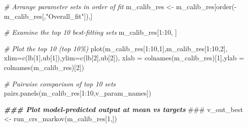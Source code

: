 \documentclass[
]{article}
\newenvironment{Shaded}{\begin{snugshade}}{\end{snugshade}}
\newcommand{\AlertTok}[1]{\textcolor[rgb]{0.94,0.16,0.16}{#1}}
\newcommand{\AttributeTok}[1]{\textcolor[rgb]{0.77,0.63,0.00}{#1}}
\newcommand{\CommentTok}[1]{\textcolor[rgb]{0.56,0.35,0.01}{\textit{#1}}}
\newcommand{\DecValTok}[1]{\textcolor[rgb]{0.00,0.00,0.81}{#1}}
\newcommand{\DocumentationTok}[1]{\textcolor[rgb]{0.56,0.35,0.01}{\textbf{\textit{#1}}}}
\newcommand{\FunctionTok}[1]{\textcolor[rgb]{0.00,0.00,0.00}{#1}}
\newcommand{\NormalTok}[1]{#1}
\newcommand{\OtherTok}[1]{\textcolor[rgb]{0.56,0.35,0.01}{#1}}
\newcommand{\SpecialCharTok}[1]{\textcolor[rgb]{0.00,0.00,0.00}{#1}}
\newcommand{\StringTok}[1]{\textcolor[rgb]{0.31,0.60,0.02}{#1}}
\begin{document}
\begin{Shaded}
\begin{Highlighting}[]
\CommentTok{\# Arrange parameter sets in order of fit}
\NormalTok{m\_calib\_res }\OtherTok{\textless{}{-}}\NormalTok{ m\_calib\_res[}\FunctionTok{order}\NormalTok{(}\SpecialCharTok{{-}}\NormalTok{m\_calib\_res[,}\StringTok{"Overall\_fit"}\NormalTok{]),]}

\CommentTok{\# Examine the top 10 best{-}fitting sets}
\NormalTok{m\_calib\_res[}\DecValTok{1}\SpecialCharTok{:}\DecValTok{10}\NormalTok{, ]}

\CommentTok{\# Plot the top 10 (top 10\%)}
\FunctionTok{plot}\NormalTok{(m\_calib\_res[}\DecValTok{1}\SpecialCharTok{:}\DecValTok{10}\NormalTok{,}\DecValTok{1}\NormalTok{],m\_calib\_res[}\DecValTok{1}\SpecialCharTok{:}\DecValTok{10}\NormalTok{,}\DecValTok{2}\NormalTok{],}
     \AttributeTok{xlim=}\FunctionTok{c}\NormalTok{(lb[}\DecValTok{1}\NormalTok{],ub[}\DecValTok{1}\NormalTok{]),}\AttributeTok{ylim=}\FunctionTok{c}\NormalTok{(lb[}\DecValTok{2}\NormalTok{],ub[}\DecValTok{2}\NormalTok{]),}
     \AttributeTok{xlab =} \FunctionTok{colnames}\NormalTok{(m\_calib\_res)[}\DecValTok{1}\NormalTok{],}\AttributeTok{ylab =} \FunctionTok{colnames}\NormalTok{(m\_calib\_res)[}\DecValTok{2}\NormalTok{])}

\CommentTok{\# Pairwise comparison of top 10 sets}
\FunctionTok{pairs.panels}\NormalTok{(m\_calib\_res[}\DecValTok{1}\SpecialCharTok{:}\DecValTok{10}\NormalTok{,v\_param\_names])}


\DocumentationTok{\#\#\# Plot model{-}predicted output at mean vs targets }\AlertTok{\#\#\#}
\NormalTok{v\_out\_best }\OtherTok{\textless{}{-}} \FunctionTok{run\_crs\_markov}\NormalTok{(m\_calib\_res[}\DecValTok{1}\NormalTok{,])}


\end{Highlighting}
\end{Shaded}
\end{document}
